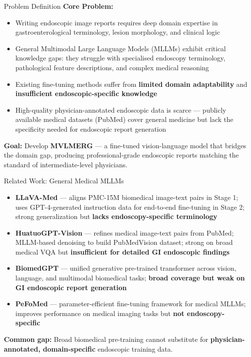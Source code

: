 ﻿\documentclass[aspectratio=169]{beamer}
\newcommand{\scite}[1]{{\footnotesize\color{darkgray}\citet{#1}}}
\begin{document}
\begin{frame}{Problem Definition}
\textbf{Core Problem:}
\begin{itemize}
    \item Writing endoscopic image reports requires deep domain expertise in gastroenterological terminology, lesion morphology, and clinical logic
    \item General Multimodal Large Language Models (MLLMs) exhibit critical knowledge gaps: they struggle with specialised endoscopy terminology, pathological feature descriptions, and complex medical reasoning
    \item Existing fine-tuning methods suffer from \textbf{limited domain adaptability} and \textbf{insufficient endoscopic-specific knowledge}
    \item High-quality physician-annotated endoscopic data is scarce --- publicly available medical datasets (PubMed) cover general medicine but lack the specificity needed for endoscopic report generation
\end{itemize}
\vspace{0.8em}
\textbf{Goal:} Develop \textbf{MVLMERG} --- a fine-tuned vision-language model that bridges the domain gap, producing professional-grade endoscopic reports matching the standard of intermediate-level physicians. \scite{pmc2024endo,frontiers2024survey}
\end{frame}

\begin{frame}{Related Work: General Medical MLLMs}
\begin{itemize}
    \item \textbf{LLaVA-Med} \scite{neurips2023llava} --- aligns PMC-15M biomedical image-text pairs in Stage 1; uses GPT-4-generated instruction data \scite{openai2023gpt4} for end-to-end fine-tuning in Stage 2; strong generalization but \textbf{lacks endoscopy-specific terminology}
    \item \textbf{HuatuoGPT-Vision} \scite{chen2024huatuo} --- refines medical image-text pairs from PubMed; MLLM-based denoising to build PubMedVision dataset; strong on broad medical VQA but \textbf{insufficient for detailed GI endoscopic findings}
    \item \textbf{BiomedGPT} \scite{zhang2024biomedgpt} --- unified generative pre-trained transformer across vision, language, and multimodal biomedical tasks; \textbf{broad coverage but weak on GI endoscopic report generation}
    \item \textbf{PeFoMed} \scite{frontiers2024survey} --- parameter-efficient fine-tuning framework for medical MLLMs; improves performance on medical imaging tasks but \textbf{not endoscopy-specific}
\end{itemize}
\vspace{0.3em}
\textbf{Common gap:} Broad biomedical pre-training cannot substitute for \textbf{physician-annotated, domain-specific} endoscopic training data.
\end{frame}
\end{document}
